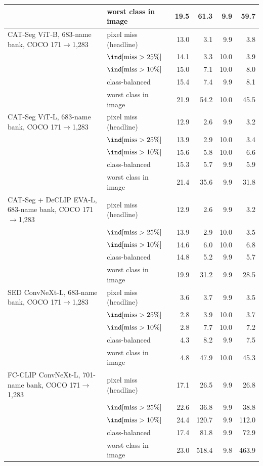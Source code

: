 \begin{tabular}{@{}llrrrr@{}}
 & worst class in image & 19.5 & 61.3 & 9.9 & 59.7 \\
\midrule
CAT-Seg ViT-B, 683-name bank, COCO 171$\to$1,283 & pixel miss (headline) & 13.0 & 3.1 & 9.9 & 3.8 \\
 & $\ind[\text{miss} > 25\%]$ & 14.1 & 3.3 & 10.0 & 3.9 \\
 & $\ind[\text{miss} > 10\%]$ & 15.0 & 7.1 & 10.0 & 8.0 \\
 & class-balanced & 15.4 & 7.4 & 9.9 & 8.1 \\
 & worst class in image & 21.9 & 54.2 & 10.0 & 45.5 \\
\midrule
CAT-Seg ViT-L, 683-name bank, COCO 171$\to$1,283 & pixel miss (headline) & 12.9 & 2.6 & 9.9 & 3.2 \\
 & $\ind[\text{miss} > 25\%]$ & 13.9 & 2.9 & 10.0 & 3.4 \\
 & $\ind[\text{miss} > 10\%]$ & 15.6 & 5.8 & 10.0 & 6.6 \\
 & class-balanced & 15.3 & 5.7 & 9.9 & 5.9 \\
 & worst class in image & 21.4 & 35.6 & 9.9 & 31.8 \\
\midrule
CAT-Seg + DeCLIP EVA-L, 683-name bank, COCO 171$\to$1,283 & pixel miss (headline) & 12.9 & 2.6 & 9.9 & 3.2 \\
 & $\ind[\text{miss} > 25\%]$ & 13.9 & 2.9 & 10.0 & 3.5 \\
 & $\ind[\text{miss} > 10\%]$ & 14.6 & 6.0 & 10.0 & 6.8 \\
 & class-balanced & 14.8 & 5.2 & 9.9 & 5.7 \\
 & worst class in image & 19.9 & 31.2 & 9.9 & 28.5 \\
\midrule
SED ConvNeXt-L, 683-name bank, COCO 171$\to$1,283 & pixel miss (headline) & 3.6 & 3.7 & 9.9 & 3.5 \\
 & $\ind[\text{miss} > 25\%]$ & 2.8 & 3.9 & 10.0 & 3.7 \\
 & $\ind[\text{miss} > 10\%]$ & 2.8 & 7.7 & 10.0 & 7.2 \\
 & class-balanced & 4.3 & 8.2 & 9.9 & 7.5 \\
 & worst class in image & 4.8 & 47.9 & 10.0 & 45.3 \\
\midrule
FC-CLIP ConvNeXt-L, 701-name bank, COCO 171$\to$1,283 & pixel miss (headline) & 17.1 & 26.5 & 9.9 & 26.8 \\
 & $\ind[\text{miss} > 25\%]$ & 22.6 & 36.8 & 9.9 & 38.8 \\
 & $\ind[\text{miss} > 10\%]$ & 24.4 & 120.7 & 9.9 & 112.0 \\
 & class-balanced & 17.4 & 81.8 & 9.9 & 72.9 \\
 & worst class in image & 23.0 & 518.4 & 9.8 & 463.9 \\
\bottomrule
\end{tabular}
